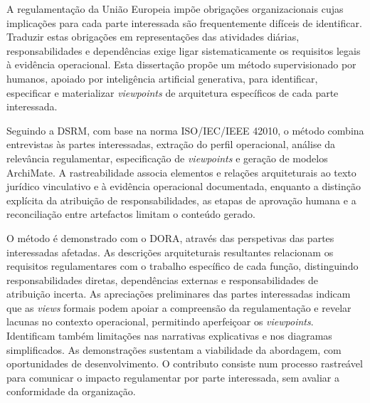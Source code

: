 \acresetall

\begingroup
\singlespacing
\setlength{\parskip}{8pt}
\setlength{\parindent}{1.5em}


\noindent A regulamentação da União Europeia impõe obrigações organizacionais cujas implicações para cada parte interessada são frequentemente difíceis de identificar. Traduzir estas obrigações em representações das atividades diárias, responsabilidades e dependências exige ligar sistematicamente os requisitos legais à evidência operacional. Esta dissertação propõe um método supervisionado por humanos, apoiado por inteligência artificial generativa, para identificar, especificar e materializar \textit{viewpoints} de arquitetura específicos de cada parte interessada.

Seguindo a DSRM, com base na norma ISO/IEC/IEEE 42010, o método combina entrevistas às partes interessadas, extração do perfil operacional, análise da relevância regulamentar, especificação de \textit{viewpoints} e geração de modelos ArchiMate. A rastreabilidade associa elementos e relações arquiteturais ao texto jurídico vinculativo e à evidência operacional documentada, enquanto a distinção explícita da atribuição de responsabilidades, as etapas de aprovação humana e a reconciliação entre artefactos limitam o conteúdo gerado.

O método é demonstrado com o DORA, através das perspetivas das partes interessadas afetadas. As descrições arquiteturais resultantes relacionam os requisitos regulamentares com o trabalho específico de cada função, distinguindo responsabilidades diretas, dependências externas e responsabilidades de atribuição incerta. As apreciações preliminares das partes interessadas indicam que as \textit{views} formais podem apoiar a compreensão da regulamentação e revelar lacunas no contexto operacional, permitindo aperfeiçoar os \textit{viewpoints}. Identificam também limitações nas narrativas explicativas e nos diagramas simplificados. As demonstrações sustentam a viabilidade da abordagem, com oportunidades de desenvolvimento. O contributo consiste num processo rastreável para comunicar o impacto regulamentar por parte interessada, sem avaliar a conformidade da organização.

\endgroup